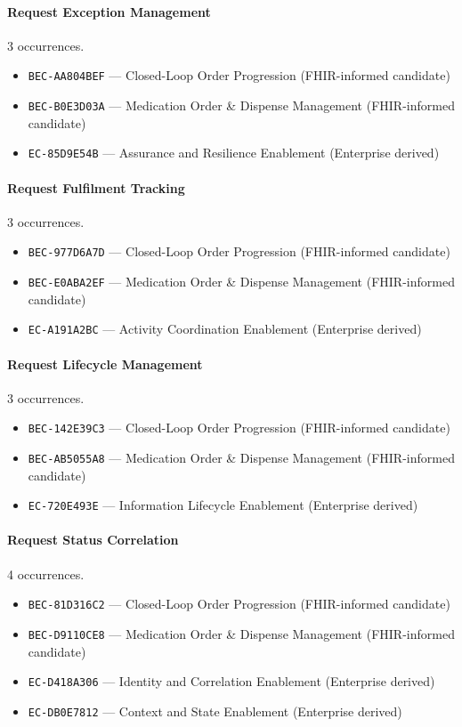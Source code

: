 \documentclass[11pt,a4paper,openany]{book}
\begin{document}
\paragraph{Request Exception Management} 3 occurrences.\par
\begin{itemize}
\item \texttt{BEC-AA804BEF} --- Closed-Loop Order Progression (FHIR-informed candidate)
\item \texttt{BEC-B0E3D03A} --- Medication Order \& Dispense Management (FHIR-informed candidate)
\item \texttt{EC-85D9E54B} --- Assurance and Resilience Enablement (Enterprise derived)
\end{itemize}
\paragraph{Request Fulfilment Tracking} 3 occurrences.\par
\begin{itemize}
\item \texttt{BEC-977D6A7D} --- Closed-Loop Order Progression (FHIR-informed candidate)
\item \texttt{BEC-E0ABA2EF} --- Medication Order \& Dispense Management (FHIR-informed candidate)
\item \texttt{EC-A191A2BC} --- Activity Coordination Enablement (Enterprise derived)
\end{itemize}
\paragraph{Request Lifecycle Management} 3 occurrences.\par
\begin{itemize}
\item \texttt{BEC-142E39C3} --- Closed-Loop Order Progression (FHIR-informed candidate)
\item \texttt{BEC-AB5055A8} --- Medication Order \& Dispense Management (FHIR-informed candidate)
\item \texttt{EC-720E493E} --- Information Lifecycle Enablement (Enterprise derived)
\end{itemize}
\paragraph{Request Status Correlation} 4 occurrences.\par
\begin{itemize}
\item \texttt{BEC-81D316C2} --- Closed-Loop Order Progression (FHIR-informed candidate)
\item \texttt{BEC-D9110CE8} --- Medication Order \& Dispense Management (FHIR-informed candidate)
\item \texttt{EC-D418A306} --- Identity and Correlation Enablement (Enterprise derived)
\item \texttt{EC-DB0E7812} --- Context and State Enablement (Enterprise derived)
\end{itemize}
\end{document}

